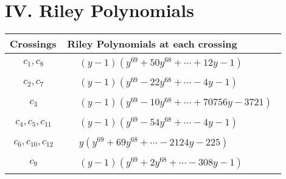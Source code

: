 \documentclass[1p]{elsarticle_modified}
\theoremstyle{definition}
\begin{document}
\centering \section*{ IV. Riley Polynomials}
\begin{tabular}{m{50pt}|m{274pt}}
Crossings & \hspace{64pt}Riley Polynomials at each crossing \\
\hline $$\begin{aligned}c_{1},c_{8}\end{aligned}$$&$\begin{aligned}
&(y-1)(y^{69}+50 y^{68}+\cdots+12 y-1)
\end{aligned}$\\
\hline $$\begin{aligned}c_{2},c_{7}\end{aligned}$$&$\begin{aligned}
&(y-1)(y^{69}-22 y^{68}+\cdots-4 y-1)
\end{aligned}$\\
\hline $$\begin{aligned}c_{3}\end{aligned}$$&$\begin{aligned}
&(y-1)(y^{69}-10 y^{68}+\cdots+70756 y-3721)
\end{aligned}$\\
\hline $$\begin{aligned}c_{4},c_{5},c_{11}\end{aligned}$$&$\begin{aligned}
&(y-1)(y^{69}-54 y^{68}+\cdots-4 y-1)
\end{aligned}$\\
\hline $$\begin{aligned}c_{6},c_{10},c_{12}\end{aligned}$$&$\begin{aligned}
&y(y^{69}+69 y^{68}+\cdots-2124 y-225)
\end{aligned}$\\
\hline $$\begin{aligned}c_{9}\end{aligned}$$&$\begin{aligned}
&(y-1)(y^{69}+2 y^{68}+\cdots-308 y-1)
\end{aligned}$\\
\hline
\end{tabular}
\vskip 2pc
\end{document}
